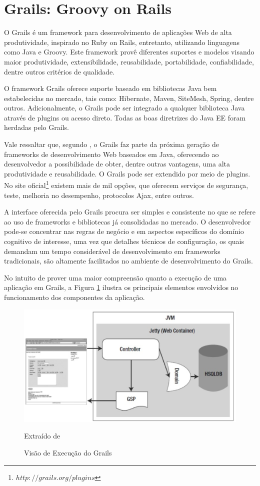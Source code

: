 \section{Grails: Groovy on Rails}
\label{grails_web}

O Grails é um framework para desenvolvimento de aplicações Web de alta produtividade, inspirado no Ruby on Rails, entretanto, utilizando linguagens como Java e Groovy. Este framework provê diferentes suportes e modelos
visando maior produtividade, extensibilidade, reusabilidade, portabilidade, confiabilidade, dentre outros critérios de qualidade. 	

O framework Grails oferece suporte baseado em bibliotecas Java bem estabelecidas no mercado, tais como: Hibernate, Maven, SiteMesh, Spring, dentre outros. Adicionalmente, o Grails pode ser integrado a qualquer biblioteca
Java através de plugins ou acesso direto. Todas as boas diretrizes do Java EE foram herdadas pelo Grails.

Vale ressaltar que, segundo \cite{smith2009}, o Grails faz parte da próxima geração de frameworks de desenvolvimento Web baseados em Java, oferecendo ao desenvolvedor a possibilidade de obter, dentre outras vantagens, uma alta produtividade e reusabilidade. O Grails pode ser extendido por meio de plugins. No site oficial\footnote{$http://grails.org/plugins$} existem mais de mil opções, que oferecem serviços de segurança, teste, melhoria no desempenho, protocolos Ajax, entre outros.

A interface oferecida pelo Grails procura ser simples e consistente no que se refere ao uso de frameworks e bibliotecas já consolidadas no mercado. O desenvolvedor pode-se concentrar nas regras de negócio e em aspectos
específicos do domínio cognitivo de interesse, uma vez que detalhes técnicos de configuração, os quais demandam um tempo considerável de desenvolvimento em frameworks tradicionais, são altamente facilitados no ambiente de desenvolvimento do Grails.

No intuito de prover uma maior compreensão quanto a execução de uma aplicação em Grails, a Figura \ref{execucao-grails} ilustra os principais elementos envolvidos no funcionamento dos componentes da aplicação.

\graphicspath{{figuras/}}
\begin{figure}[H]
\centering
\includegraphics[width=1.0\textwidth]{execucao-grails}
\caption{Visão de Execução do Grails}{Extraído de \cite{juddbeginning2008}} 
\label{execucao-grails}
\end{figure}

